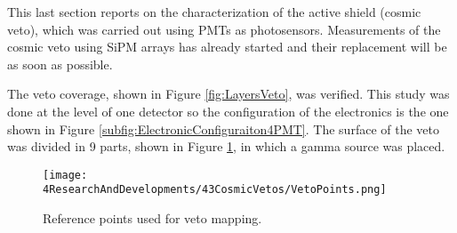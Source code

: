 This last section reports on the characterization of the active shield (cosmic veto), which was carried out using PMTs as photosensors. Measurements of the cosmic veto using SiPM arrays has already started and their replacement will be as soon as possible. 

The veto coverage, shown in Figure \ref{fig:LayersVeto}, was verified. This study was done at the level of one detector so the configuration of the electronics is the one shown in Figure \ref{subfig:ElectronicConfiguraiton4PMT}. The surface of the veto was divided in 9 parts, shown in Figure \ref{fig:MappingPoints}, in which a gamma source was placed.

\begin{figure}[h]
\centering
\texttt{[image: 4ResearchAndDevelopments/43CosmicVetos/VetoPoints.png]}
\caption{Reference points used for veto mapping.\label{fig:MappingPoints}}
\end{figure}

